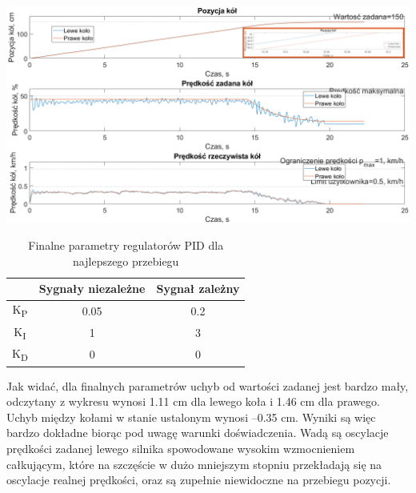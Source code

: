 \begin{center}
    \includegraphics[scale=0.37]{images/wykresyfinalne.png}
    \label{fig:finalneprzebiegi}
\end{center}

\newpage

\begin{table}[!h]
\begin{tabular}{c|c|c|}
\cline{2-3}
\textbf{}                & Sygnały niezależne     & Sygnał zależny         \\ \hline
\multicolumn{1}{|c|}{K\textsubscript{P}} & 0.05                   & 0.2                    \\ \hline
\multicolumn{1}{|c|}{K\textsubscript{I}} & 1                      & 3                      \\ \hline
\multicolumn{1}{|c|}{K\textsubscript{D}} & \multicolumn{1}{c|}{0} & \multicolumn{1}{c|}{0} \\ \hline
\end{tabular}
\caption{Finalne parametry regulatorów PID dla najlepszego przebiegu}
\end{table}
\label{tab:finalneparametrypid}

Jak widać, dla finalnych parametrów uchyb od wartości zadanej jest bardzo mały, odczytany z wykresu wynosi 1.11 cm dla lewego koła i 1.46 cm dla prawego. Uchyb między kołami w stanie ustalonym wynosi --0.35 cm. Wyniki są więc bardzo dokładne biorąc pod uwagę warunki doświadczenia. Wadą są oscylacje prędkości zadanej lewego silnika spowodowane wysokim wzmocnieniem całkującym, które na szczęście w dużo mniejszym stopniu przekładają się na oscylacje realnej prędkości, oraz są zupełnie niewidoczne na przebiegu pozycji.